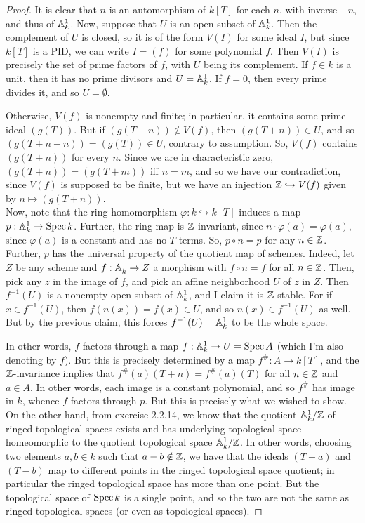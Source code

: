 \begin{proof}
	It is clear that $n$ is an automorphism of $k[T]$ for each $n$, with inverse $-n$, and thus of $\AA^1_k$. Now, suppose that $U$ is an open subset of $\AA^1_k$. Then the complement of $U$ is closed, so it is of the form $V(I)$ for some ideal $I$, but since $k[T]$ is a PID, we can write $I = (f)$ for some polynomial $f$. Then $V(I)$ is precisely the set of prime factors of $f$, with $U$ being its complement. If $f \in k$ is a unit, then it has no prime divisors and $U = \AA^1_k$. If $f = 0$, then every prime divides it, and so $U = \emptyset$.
	
	Otherwise, $V(f)$ is nonempty and finite; in particular, it contains some prime ideal $(g(T))$. But if $(g(T+n)) \notin V(f)$, then $(g(T+n)) \in U$, and so $(g(T+n-n)) = (g(T)) \in U$, contrary to assumption. So, $V(f)$ contains $(g(T+n))$ for every $n$. Since we are in characteristic zero, $(g(T+n)) = (g(T+m))$ iff $n = m$, and so we have our contradiction, since $V(f)$ is supposed to be finite, but we have an injection $\ZZ \hookrightarrow V(f)$ given by $n \mapsto (g(T+n))$. \\
	
	Now, note that the ring homomorphism $\varphi : k \hookrightarrow k[T]$ induces a map $p : \AA^1_k \to \Spec k$. Further, the ring map is $\ZZ$-invariant, since $n \cdot \varphi(a) = \varphi(a)$, since $\varphi(a)$ is a constant and has no $T$-terms. So, $p \circ n = p$ for any $n \in \ZZ$. Further, $p$ has the universal property of the quotient map of schemes. Indeed, let $Z$ be any scheme and $f : \AA^1_k \to Z$ a morphism with $f \circ n = f$ for all $n \in \ZZ$. Then, pick any $z$ in the image of $f$, and pick an affine neighborhood $U$ of $z$ in $Z$. Then $f^{-1}(U)$ is a nonempty open subset of $\AA^1_k$, and I claim it is $\ZZ$-stable. For if $x \in f^{-1}(U)$, then $f(n(x)) = f(x) \in U$, and so $n(x) \in f^{-1}(U)$ as well. But by the previous claim, this forces $f^{-1}(U) = \AA^1_k$ to be the whole space.
	
	In other words, $f$ factors through a map $f : \AA^1_k \to U = \Spec A$ (which I'm also denoting by $f$). But this is precisely determined by a map $f^\# : A \to k[T]$, and the $\ZZ$-invariance implies that $f^\#(a)(T+n) = f^\#(a)(T)$ for all $n \in \ZZ$ and $a \in A$. In other words, each image is a constant polynomial, and so $f^\#$ has image in $k$, whence $f$ factors through $p$. But this is precisely what we wished to show. \\
	
	On the other hand, from exercise 2.2.14, we know that the quotient $\AA^1_k/\ZZ$ of ringed topological spaces exists and has underlying topological space homeomorphic to the quotient topological space $\AA^1_k/\ZZ$. In other words, choosing two elements $a,b \in k$ such that $a-b \notin \ZZ$, we have that the ideals $(T-a)$ and $(T-b)$ map to different points in the ringed topological space quotient; in particular the ringed topological space has more than one point. But the topological space of $\Spec k$ is a single point, and so the two are not the same as ringed topological spaces (or even as topological spaces).
\end{proof}
